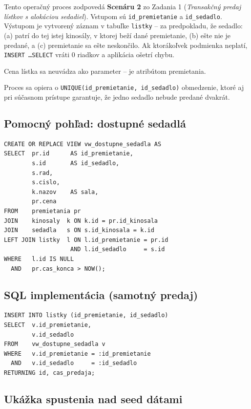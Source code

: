 \documentclass[11pt, a4paper]{article}
\begin{document}
Tento operačný proces zodpovedá \textbf{Scenáru 2} zo Zadania 1
(\emph{Transakčný predaj lístkov s alokáciou sedadiel}). Vstupom sú
\texttt{id\_premietanie} a \texttt{id\_sedadlo}. Výstupom je vytvorený
záznam v tabuľke \texttt{listky} -- za predpokladu, že sedadlo:
(a) patrí do tej istej kinosály, v ktorej beží dané premietanie,
(b) ešte nie je predané, a (c) premietanie sa ešte neskončilo.
Ak ktorákoľvek podmienka neplatí, \texttt{INSERT \ldots SELECT} vráti
0 riadkov a aplikácia ošetrí chybu.

Cena lístka sa neuvádza ako parameter -- je atribútom premietania.

Proces sa opiera o \texttt{UNIQUE(id\_premietanie, id\_sedadlo)} obmedzenie,
ktoré aj pri súčasnom prístupe garantuje, že jedno sedadlo nebude predané
dvakrát.

\subsection{Pomocný pohľad: dostupné sedadlá}

\begin{lstlisting}[caption={Pohľad: dostupné sedadlá pre dané (ešte neskončené) premietanie}]
CREATE OR REPLACE VIEW vw_dostupne_sedadla AS
SELECT  pr.id      AS id_premietanie,
        s.id       AS id_sedadlo,
        s.rad,
        s.cislo,
        k.nazov    AS sala,
        pr.cena
FROM    premietania pr
JOIN    kinosaly  k ON k.id = pr.id_kinosala
JOIN    sedadla   s ON s.id_kinosala = k.id
LEFT JOIN listky  l ON l.id_premietanie = pr.id
                   AND l.id_sedadlo     = s.id
WHERE   l.id IS NULL
  AND   pr.cas_konca > NOW();
\end{lstlisting}

\subsection{SQL implementácia (samotný predaj)}

\begin{lstlisting}[caption={Atomický INSERT lístka -- pure SQL, bez procedúr}]
INSERT INTO listky (id_premietanie, id_sedadlo)
SELECT  v.id_premietanie,
        v.id_sedadlo
FROM    vw_dostupne_sedadla v
WHERE   v.id_premietanie = :id_premietanie
  AND   v.id_sedadlo     = :id_sedadlo
RETURNING id, cas_predaja;
\end{lstlisting}

\subsection{Ukážka spustenia nad seed dátami}
\end{document}
